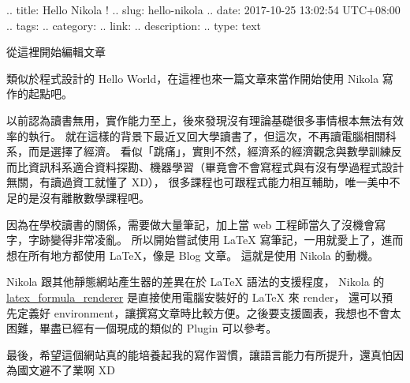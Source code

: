 .. title: Hello Nikola !
.. slug: hello-nikola
.. date: 2017-10-25 13:02:54 UTC+08:00
.. tags: 
.. category: 
.. link: 
.. description: 
.. type: text

\begin{blockquote}從這裡開始編輯文章\end{blockquote}

類似於程式設計的 Hello World，在這裡也來一篇文章來當作開始使用 Nikola 寫作的起點吧。

以前認為讀書無用，實作能力至上，後來發現沒有理論基礎很多事情根本無法有效率的執行。
就在這樣的背景下最近又回大學讀書了，但這次，不再讀電腦相關科系，而是選擇了經濟。
看似「跳痛」，實則不然，經濟系的經濟觀念與數學訓練反而比資訊科系適合資料探勘、機器學習（畢竟會不會寫程式與有沒有學過程式設計無關，有讀過資工就懂了 XD），
很多課程也可跟程式能力相互輔助，唯一美中不足的是沒有離散數學課程吧。

因為在學校讀書的關係，需要做大量筆記，加上當 web 工程師當久了沒機會寫字，字跡變得非常凌亂。
所以開始嘗試使用 LaTeX 寫筆記，一用就愛上了，進而想在所有地方都使用 LaTeX，像是 Blog 文章。
這就是使用 Nikola 的動機。

Nikola 跟其他靜態網站產生器的差異在於 LaTeX 語法的支援程度，
Nikola 的 \href{https://plugins.getnikola.com/v7/latex_formula_renderer/}{latex_formula_renderer} 是直接使用電腦安裝好的 LaTeX 來 render，
還可以預先定義好 environment，讓撰寫文章時比較方便。之後要支援圖表，我想也不會太困難，畢盡已經有一個現成的類似的 Plugin 可以參考。

最後，希望這個網站真的能培養起我的寫作習慣，讓語言能力有所提升，還真怕因為國文避不了業啊 XD 